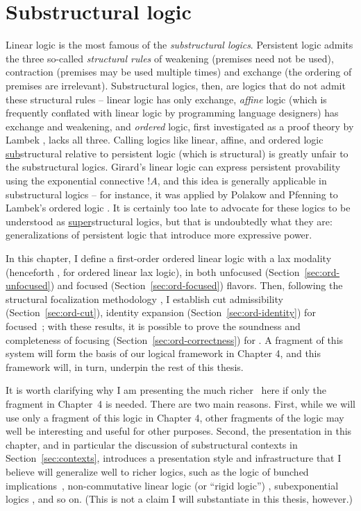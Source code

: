 \chapter{Substructural logic}

Linear logic is the most famous of the {\it substructural logics}.
Persistent logic admits the three so-called {\it structural rules} of
weakening (premises need not be used), contraction (premises may be
used multiple times) and exchange (the ordering of premises are
irrelevant). Substructural logics, then, are logics that do not admit
these structural rules -- linear logic has only exchange, {\it affine}
logic (which is frequently conflated with linear logic by programming
language designers) has exchange and weakening, and {\it ordered}
logic, first investigated as a proof theory by Lambek
\cite{lambek58mathematics}, lacks all three.  Calling logics like
linear, affine, and ordered logic \underline{sub}structural relative
to persistent logic (which is structural) is greatly unfair to the
substructural logics. Girard's linear logic can express persistent
provability using the exponential connective ${!}A$, and this idea is
generally applicable in substructural logics -- for instance, it was
applied by Polakow and Pfenning to Lambek's ordered logic
\cite{polakow99natural}. It is certainly too
late to advocate for these logics to be understood as
\underline{super}structural logics, but that is undoubtedly what they
are: generalizations of persistent logic that introduce more 
expressive power.

In this chapter, I define a first-order ordered linear logic with a
lax modality (henceforth \ollll, for ordered linear lax logic), in
both unfocused (Section~\ref{sec:ord-unfocused}) and focused
(Section~\ref{sec:ord-focused}) flavors. Then, following the
structural focalization methodology \cite{simmons11structural}, I
establish cut admissibility (Section~\ref{sec:ord-cut}), identity
expansion (Section~\ref{sec:ord-identity}) for focused~\ollll; with
these results, it is possible to prove the soundness and completeness
of focusing (Section~\ref{sec:ord-correctness}) for \ollll.  A
fragment of this system will form the basis of our logical framework
in Chapter 4, and this framework will, in turn, underpin the rest of
this thesis.

It is worth clarifying why I am presenting the much richer \ollll~here
if only the fragment in Chapter~4 is needed. There are two
main reasons.  First, while we will use only a fragment of this logic
in Chapter 4, other fragments of the logic may well be interesting and
useful for other purposes. Second, the presentation in this chapter,
and in particular the discussion of substructural contexts in
Section~\ref{sec:contexts}, introduces a presentation style and
infrastructure that I believe will generalize well to richer logics,
such as the logic of bunched implications~\cite{pym02semantics},
non-commutative linear logic (or ``rigid logic'')
\cite{simmons09linear}, subexponential logics
\cite{nigam09algorithmic}, and so on. (This is not a claim I will
substantiate in this thesis, however.)

